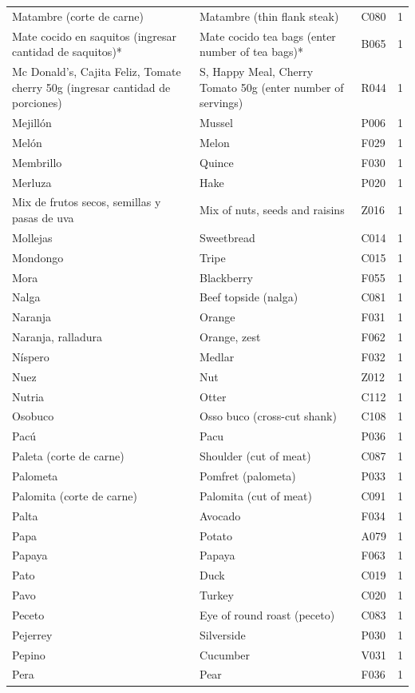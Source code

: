 {\begin{longtable}{p{4.3cm}p{5.5cm}p{1.5cm}p{0.7cm}}
Matambre (corte de carne) & Matambre (thin flank steak) & C080 & 1\\
Mate cocido en saquitos (ingresar cantidad de saquitos)* & Mate cocido tea bags (enter number of tea bags)* & B065 & 1\\
Mc Donald’s, Cajita Feliz, Tomate cherry 50g (ingresar cantidad de porciones) & S, Happy Meal, Cherry Tomato 50g (enter number of servings) & R044 & 1\\
Mejillón & Mussel & P006 & 1\\
Melón & Melon & F029 & 1\\
Membrillo & Quince & F030 & 1\\
Merluza & Hake & P020 & 1\\
Mix de frutos secos, semillas y pasas de uva & Mix of nuts, seeds and raisins & Z016 & 1\\
Mollejas & Sweetbread & C014 & 1\\
Mondongo & Tripe & C015 & 1\\
Mora & Blackberry & F055 & 1\\
Nalga & Beef topside (nalga) & C081 & 1\\
Naranja & Orange & F031 & 1\\
Naranja, ralladura & Orange, zest & F062 & 1\\
Níspero & Medlar & F032 & 1\\
Nuez & Nut & Z012 & 1\\
Nutria & Otter & C112 & 1\\
Osobuco & Osso buco (cross-cut shank) & C108 & 1\\
Pacú & Pacu & P036 & 1\\
Paleta (corte de carne) & Shoulder (cut of meat) & C087 & 1\\
Palometa & Pomfret (palometa) & P033 & 1\\
Palomita (corte de carne) & Palomita (cut of meat) & C091 & 1\\
Palta & Avocado & F034 & 1\\
Papa & Potato & A079 & 1\\
Papaya & Papaya & F063 & 1\\
Pato & Duck & C019 & 1\\
Pavo & Turkey & C020 & 1\\
Peceto & Eye of round roast (peceto) & C083 & 1\\
Pejerrey & Silverside & P030 & 1\\
Pepino & Cucumber & V031 & 1\\
Pera & Pear & F036 & 1\\

\end{longtable}}
